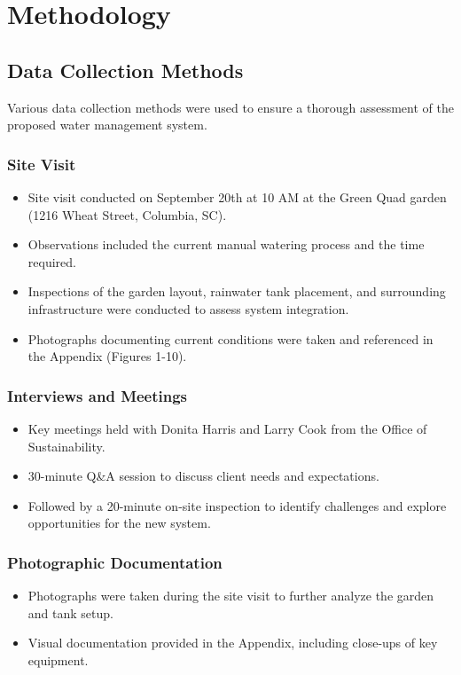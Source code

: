 \documentclass[11pt]{article}
\begin{document}
\section{Methodology}

\subsection{Data Collection Methods}
Various data collection methods were used to ensure a thorough assessment of the proposed water management system.

\subsubsection{Site Visit}
\begin{itemize}
    \item Site visit conducted on September 20th at 10 AM at the Green Quad garden (1216 Wheat Street, Columbia, SC).
    \item Observations included the current manual watering process and the time required.
    \item Inspections of the garden layout, rainwater tank placement, and surrounding infrastructure were conducted to assess system integration.
    \item Photographs documenting current conditions were taken and referenced in the Appendix (Figures 1-10).
\end{itemize}

\subsubsection{Interviews and Meetings}
\begin{itemize}
    \item Key meetings held with Donita Harris and Larry Cook from the Office of Sustainability.
    \item 30-minute Q\&A session to discuss client needs and expectations.
    \item Followed by a 20-minute on-site inspection to identify challenges and explore opportunities for the new system.
\end{itemize}

\subsubsection{Photographic Documentation}
\begin{itemize}
    \item Photographs were taken during the site visit to further analyze the garden and tank setup.
    \item Visual documentation provided in the Appendix, including close-ups of key equipment.
\end{itemize}
\end{document}
